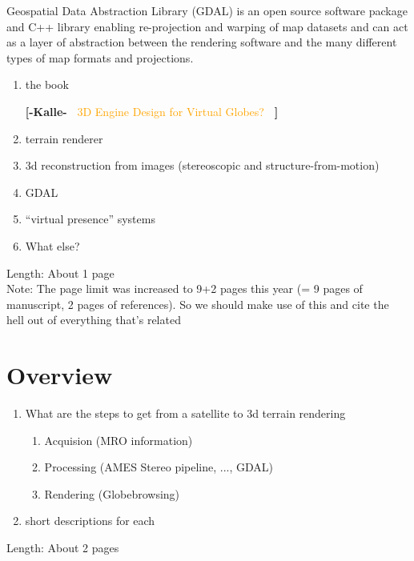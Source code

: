 \documentclass[journal]{vgtc}                %
\newcommand{\kallecomment}[1]{\textbf{[-Kalle-~}
    \textcolor{orange}{#1}
    \textbf{~]}}
\begin{document}
Geospatial Data Abstraction Library (GDAL) is an open source software package and C++ library enabling re-projection and warping of map datasets and can act as a layer of abstraction between the rendering software and the many different types of map formats and projections.

\begin{enumerate}
\item the book

\kallecomment{3D Engine Design for Virtual Globes?}

\item terrain renderer
\item 3d reconstruction from images (stereoscopic and structure-from-motion)
\item GDAL
\item ``virtual presence'' systems
\item What else?
\end{enumerate}
Length: About 1 page\\
Note:  The page limit was increased to 9+2 pages this year (= 9 pages of manuscript, 2 pages of references). So we should make use of this and cite the hell out of everything that's related

\section{Overview} \label{sec:overview}



\begin{enumerate}
  \item What are the steps to get from a satellite to 3d terrain rendering
\begin{enumerate}
  \item Acquision (MRO information)
  \item Processing (AMES Stereo pipeline, ..., GDAL)
  \item Rendering (Globebrowsing)
\end{enumerate}
  \item short descriptions for each
\end{enumerate}
Length: About 2 pages
\end{document}
